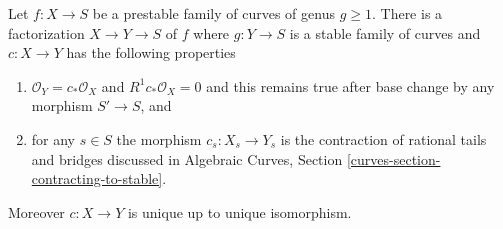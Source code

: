 \begin{lemma}
\label{lemma-contract-prestable-to-stable}
Let $f : X \to S$ be a prestable family of curves of genus $g \geq 1$.
There is a factorization $X \to Y \to S$ of $f$ where $g : Y \to S$
is a stable family of curves and $c : X \to Y$ has the following
properties
\begin{enumerate}
\item $\mathcal{O}_Y = c_*\mathcal{O}_X$ and $R^1c_*\mathcal{O}_X = 0$
and this remains true after base change by any morphism $S' \to S$, and
\item for any $s \in S$ the morphism $c_s : X_s \to Y_s$ is the
contraction of rational tails and bridges discussed in
Algebraic Curves, Section \ref{curves-section-contracting-to-stable}.
\end{enumerate}
Moreover $c : X \to Y$ is unique up to unique isomorphism.
\end{lemma}

